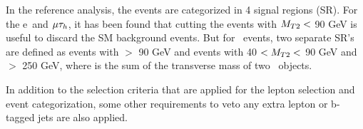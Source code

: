 In the reference analysis, the events are categorized in 4 signal regions (SR). For the e\Tau ~and $\mu\tau_h$, it has been found that cutting the events with $M_{T2} <$ 90 GeV is useful to discard the SM background events. But for \tauTau ~events, two separate SR's are defined as events with \mttwo $>$ 90 GeV and events with 40 $<M_{T2}<$ 90 GeV and \SumMT $>$ 250 GeV, where \SumMT is the sum of the transverse mass of two \Tau ~objects.

In addition to the selection criteria that are applied for the lepton selection and event categorization, some other requirements to veto any extra lepton or b-tagged jets  are also applied. 

